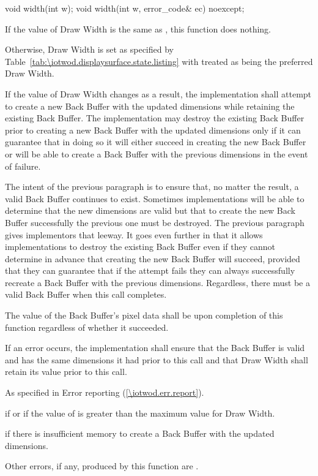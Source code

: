 \begin{itemdecl}
void width(int w);
void width(int w, error_code& ec) noexcept;
\end{itemdecl}
\begin{itemdescr}
\pnum
\effects
If the value of Draw Width is the same as , this function does nothing.

\pnum
Otherwise, Draw Width is set as specified by Table~\ref{tab:\iotwod.displaysurface.state.listing} with  treated as being the preferred Draw Width.

\pnum
If the value of Draw Width changes as a result, the implementation shall attempt to create a new Back Buffer with the updated dimensions while retaining the existing Back Buffer. The implementation may destroy the existing Back Buffer prior to creating a new Back Buffer with the updated dimensions only if it can guarantee that in doing so it will either succeed in creating the new Back Buffer or will be able to create a Back Buffer with the previous dimensions in the event of failure.

\pnum
\begin{note}
The intent of the previous paragraph is to ensure that, no matter the result, a valid Back Buffer continues to exist. Sometimes implementations will be able to determine that the new dimensions are valid but that to create the new Back Buffer successfully the previous one must be destroyed. The previous paragraph gives implementors that leeway. It goes even further in that it allows implementations to destroy the existing Back Buffer even if they cannot determine in advance that creating the new Back Buffer will succeed, provided that they can guarantee that if the attempt fails they can always successfully recreate a Back Buffer with the previous dimensions. Regardless, there must be a valid Back Buffer when this call completes.
\end{note}

\pnum
The value of the Back Buffer's pixel data shall be \unspecnorm upon completion of this function regardless of whether it succeeded.

\pnum
If an error occurs, the implementation shall ensure that the Back Buffer is valid and has the same dimensions it had prior to this call and that Draw Width shall retain its value prior to this call.

\pnum
\throws
As specified in Error reporting (\ref{\iotwod.err.report}).

\pnum
\errors
{} if  or if the value of  is greater than the maximum value for Draw Width.

 if there is insufficient memory to create a Back Buffer with the updated dimensions.

Other errors, if any, produced by this function are .
\end{itemdescr}

